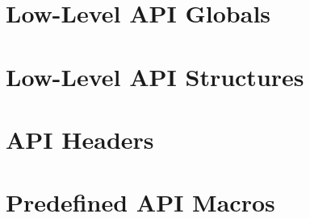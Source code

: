 \appendix
\chapter{Low-Level API Globals}
\label{apdx:llglobals}
\hypertarget{globals}{}

\newpage
\chapter{Low-Level API Structures}
\label{apdx:llstructs}
\hypertarget{structs}{}













\newpage
\chapter{API Headers}
\label{apdx:llfiles}
\hypertarget{files}{}






\newpage
\chapter{Predefined API Macros}
\label{apdx:predefined}
\lstset{basicstyle=\tiny}

